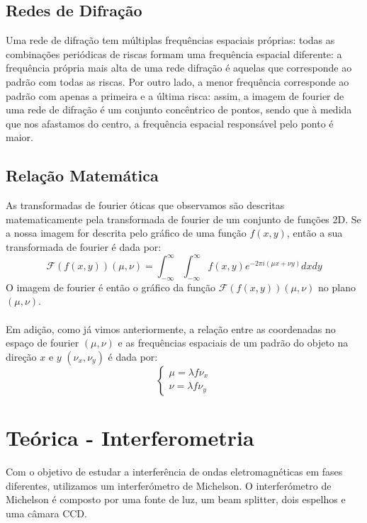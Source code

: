 \documentclass{article}
\begin{document}
\begin{multicols}{2}
\subsection{Redes de Difração}

Uma rede de difração tem múltiplas frequências espaciais próprias: todas as combinações periódicas de riscas formam uma frequência espacial diferente: a frequência própria mais alta de uma rede difração é aquelas que corresponde ao padrão com todas as riscas.
Por outro lado, a menor frequência corresponde ao padrão com apenas a primeira e a última risca: assim, a imagem de fourier de uma rede de difração é um conjunto concêntrico de pontos, sendo que à medida que nos afastamos do centro, a frequência espacial responsável pelo ponto é maior.

\subsection{Relação Matemática}

As transformadas de fourier óticas que observamos são descritas matematicamente pela transformada de fourier de um conjunto de funções 2D. 
Se a nossa imagem for descrita pelo gráfico de uma função $f(x,y)$, então a sua transformada de fourier é dada por:
\[ \mathcal{F}(f(x,y))(\mu, \nu) = \int_{-\infty}^{\infty} \int_{-\infty}^{\infty} f(x,y) e^{-2\pi i (\mu x + \nu y)} dx dy \]
O imagem de fourier é então o gráfico da função $\mathcal{F}(f(x,y))(\mu, \nu)$ no plano $(\mu, \nu)$.
\paragraph{}
Em adição, como já vimos anteriormente, a relação entre as coordenadas no espaço de fourier $(\mu, \nu)$ e as frequências espaciais de um padrão do objeto na direção $x$ e $y$ $(\nu_x, \nu_y)$ é dada por:
\[ \begin{cases}
  \mu = \lambda f \nu_x \\
  \nu = \lambda f \nu_y
\end{cases} \]

\section{Teórica - Interferometria}

Com o objetivo de estudar a interferência de ondas eletromagnéticas em fases diferentes, utilizamos um interferómetro de Michelson.
O interferómetro de Michelson é composto por uma fonte de luz, um beam splitter, dois espelhos e uma câmara CCD. 


\end{multicols}
\end{document}
